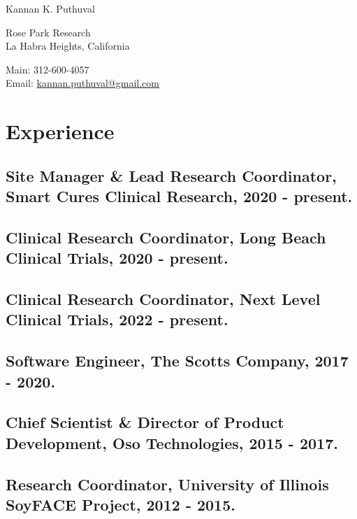 \documentclass[letterpaper]{article}
\def\name{Kannan K. Puthuval}
\begin{document}
{\huge \name}


\vspace{0.25in}

\begin{minipage}{0.45\linewidth}
  Rose Park Research \\
  La Habra Heights, California
\end{minipage}
\begin{minipage}{0.45\linewidth}
  Main: 312-600-4057 \\
  Email: \href{mailto:kannan.puthuval@gmail.com}{kannan.puthuval@gmail.com} \\
\end{minipage}

\section*{Experience}

  \subsection*{Site Manager \& Lead Research Coordinator, Smart Cures Clinical Research, 2020 - present.}

  \subsection*{Clinical Research Coordinator, Long Beach Clinical Trials, 2020 - present.}

  \subsection*{Clinical Research Coordinator, Next Level Clinical Trials, 2022 - present.}

  \subsection*{Software Engineer, The Scotts Company, 2017 - 2020.}

  \subsection*{Chief Scientist \& Director of Product Development, Oso Technologies, 2015 - 2017.}

  \subsection*{Research Coordinator, University of Illinois SoyFACE Project, 2012 - 2015.}
\end{document}
